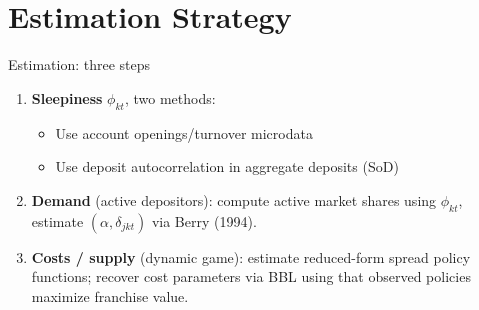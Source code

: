 \documentclass[10pt,aspectratio=169]{beamer}
\begin{document}
\section{Estimation Strategy}

\begin{frame}{Estimation: three steps}
\begin{enumerate}
	\item \textbf{Sleepiness} $\phi_{kt}$, two methods: 
	\begin{itemize}
		\item Use account openings/turnover microdata 
		\item Use deposit autocorrelation in aggregate deposits (SoD)
	\end{itemize}
	\item \textbf{Demand} (active depositors): compute active market shares using $\phi_{kt}$, estimate $(\alpha,\delta_{jkt})$ via Berry (1994).
	\item \textbf{Costs / supply} (dynamic game): estimate reduced-form spread policy functions; recover cost parameters via BBL using that observed policies maximize franchise value.
\end{enumerate}
\end{frame}
\end{document}

